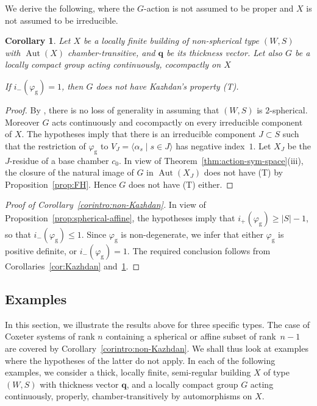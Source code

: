 \documentclass[12pt,a4paper]{amsproc}
\newtheorem{corollary}[theorem]{Corollary}
\theoremstyle{definition}
\DeclareMathOperator{\Aut}{Aut}
\newcommand{\qq}{\mathbf q}
\newcommand{\rg}{\mathrm g}
\begin{document}
We derive the following, where the $G$-action is not assumed to be proper and $X$ is not assumed to be irreducible. 


\begin{corollary}\label{cor:Lorentzian}
Let $X$ be a locally finite  building of non-spherical type $(W, S)$ with $\Aut(X)$ chamber-transitive, and  $\qq$ be its thickness vector. Let also  $G$ be a locally compact  group acting continuously, cocompactly on $X$

If $i_-(\varphi_\rg)=1$, then $G$ does not have Kazhdan's property (T). 
\end{corollary}
\begin{proof}
 By \cite[\S2]{DymJan}, there is no loss of generality in assuming that $(W, S)$ is $2$-spherical. Moreover $G$ acts continuously and cocompactly on every irreducible component of $X$. The hypotheses imply that there is an irreducible component $J \subset S$ such that the restriction of $\varphi_\rg$ to $V_J = \langle \alpha_s \mid s \in J \rangle$ has negative index~$1$. Let $X_J$ be the $J$-residue of a base chamber $c_0$. In view of Theorem~\ref{thm:action-sym-space}(iii), the closure of the natural image of $G$ in $\Aut(X_J)$ does not have (T) by Proposition~\ref{prop:FH}. Hence $G$ does not have (T) either. 
\end{proof}
	
\begin{proof}[Proof of Corollary~\ref{corintro:non-Kazhdan}]
In view of Proposition~\ref{prop:spherical-affine}, the hypotheses imply that $i_+(\varphi_\rg) \geq |S|-1$, so that $i_-(\varphi_\rg) \leq 1$. Since $\varphi_\rg$ is non-degenerate, we infer that either $\varphi_\rg$ is positive definite, or $i_-(\varphi_\rg) = 1$. The required conclusion follows from Corollaries~\ref{cor:Kazhdan} and~\ref{cor:Lorentzian}.
\end{proof}
		
		
\subsection{Examples}\label{sec:examples}

In this section, we illustrate the results above for three specific types. The case of Coxeter systems of rank $n$ containing a spherical or affine subset of rank~$n-1$ are covered by Corollary~\ref{corintro:non-Kazhdan}. We shall thus look at examples where the hypotheses of the latter do not apply. In each of the following examples, we consider a thick, locally finite, semi-regular building $X$ of type $(W, S)$ with thickness vector $\qq$, and  a locally compact group $G$ acting continuously, properly, chamber-transitively by  automorphisms on $X$.
\end{document}

